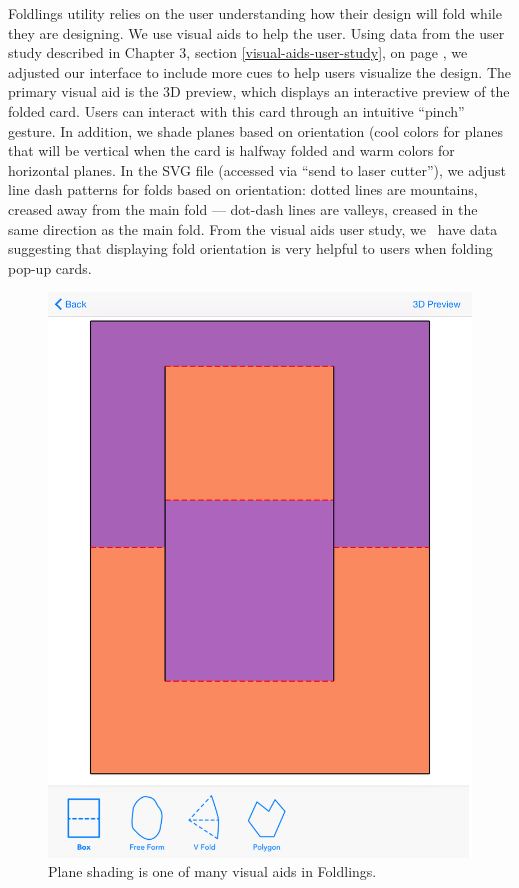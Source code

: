 Foldlings utility relies on the user understanding how their design will
fold while they are designing. We use visual aids to help the user.
Using data from the user study described in Chapter 3, section
\ref{visual-aids-user-study}, on page \pageref{visual-aids-user-study},
we adjusted our interface to include more cues to help users visualize
the design. The primary visual aid is the 3D preview, which displays an
interactive preview of the folded card. Users can interact with this
card through an intuitive ``pinch'' gesture. In addition, we shade
planes based on orientation (cool colors for planes that will be
vertical when the card is halfway folded and warm colors for horizontal
planes. In the SVG file (accessed via ``send to laser cutter''), we
adjust line dash patterns for folds based on orientation: dotted lines
are mountains, creased away from the main fold --- dot-dash lines are
valleys, creased in the same direction as the main fold. From the visual
aids user study, we ~have data suggesting that displaying fold
orientation is very helpful to users when folding pop-up cards.

\begin{figure}[htbp]
\centering
\includegraphics{figures/32_UI_Tool_Interactions/currentInterface.png}
\caption{Plane shading is one of many visual aids in Foldlings.}
\end{figure}
